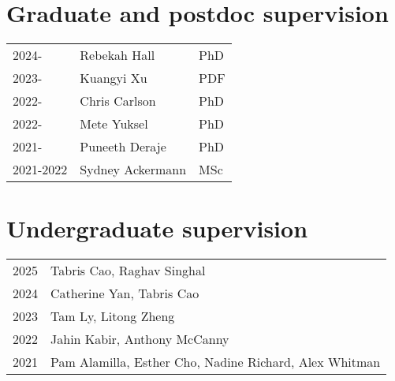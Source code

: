 \documentclass[12pt]{article}
\begin{document}
\begin{itemize}



    \end{itemize}

\section*{Graduate and postdoc supervision}

\begin{tabular}{lll}
2024- & Rebekah Hall & PhD \\	
2023- & Kuangyi Xu & PDF \\
2022- & Chris Carlson & PhD \\
2022- & Mete Yuksel & PhD \\
2021- & Puneeth Deraje & PhD \\
2021-2022 & Sydney Ackermann & MSc
\end{tabular}

\section*{Undergraduate supervision}

\begin{tabular}{ll}
2025 & Tabris Cao, Raghav Singhal \\
2024 & Catherine Yan, Tabris Cao \\
2023 & Tam Ly, Litong Zheng \\
2022 & Jahin Kabir, Anthony McCanny \\
2021 & Pam Alamilla, Esther Cho, Nadine Richard, Alex Whitman
\end{tabular}
\end{document}
